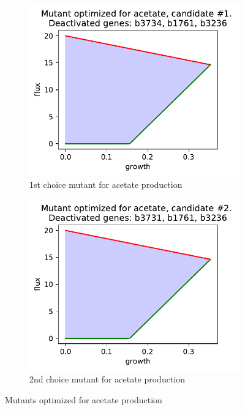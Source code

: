 \documentclass{scrartcl}
\begin{document}
   
   \begin{figure}[h]
      \centering
      \begin{subfigure}{.49\textwidth}
         \centering
         \includegraphics[width=\linewidth]{q1_results/result_q1_acetate_1.pdf}
         \caption{1st choice mutant for acetate production}
         \label{fig:acetate_mutant_1}
      \end{subfigure}%
      \begin{subfigure}{.49\textwidth}
         \centering
         \includegraphics[width=\linewidth]{q1_results/result_q1_acetate_2.pdf}
         \caption{2nd choice mutant for acetate production}
         \label{fig:acetate_mutant_2}
      \end{subfigure}
      \caption{Mutants optimized for acetate production}
      \label{fig:acetate_mutants}
   \end{figure}
   
\end{document}
